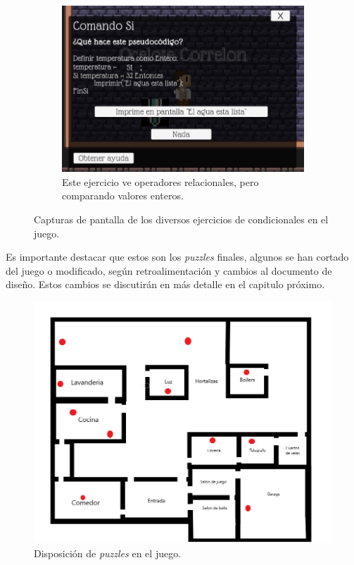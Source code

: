 \begin{itemize}
\begin{figure}[H]
\begin{subfigure}{\textwidth}
        \end{subfigure}
        \begin{subfigure}{\textwidth}
            \centering
            \includegraphics[width=0.5\linewidth]{images/Puzzlecondicional4.png}
            \caption{Este ejercicio ve operadores relacionales, pero comparando valores enteros.}
            \label{fig:puzzle_condicionales4}
        \end{subfigure}
        \caption{Capturas de pantalla de los diversos ejercicios de condicionales en el juego.}
        \label{fig:puzzle_condicionales}
    \end{figure}
\end{itemize}

Es importante destacar que estos son los \textit{puzzles} finales, algunos se han cortado del juego o modificado, según retroalimentación y cambios al documento de diseño. Estos cambios se discutirán en más detalle en el capitulo próximo. 

\begin{figure}[ht]
    \centering
    \includegraphics[width=0.5\linewidth]{images/MapaJuegoConItems.png}
    \caption{Disposición de \textit{puzzles} en el juego.}
    \label{fig:items_on_map}
\end{figure}

